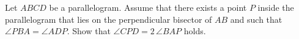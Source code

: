 Let $ABCD$ be a parallelogram. Assume that there exists a point $P$ inside the parallelogram that lies
on the perpendicular bisector of $AB$ and such that $\angle PBA=\angle ADP$.
Show that $\angle CPD=2 \,\angle BAP$ holds.